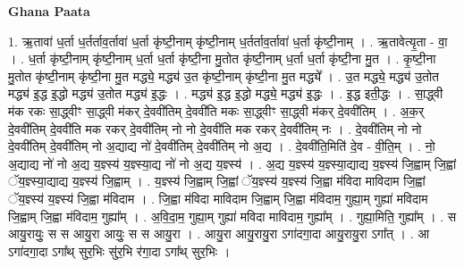 \documentclass[17pt]{extarticle}
\begin{document}
\textbf{Ghana Paata } \newline

1. ऋ॒तावा॑ ध॒र्ता ध॒र्तर्ताव॒र्तावा॑ ध॒र्ता कृ॑ष्टी॒नाम् कृ॑ष्टी॒नाम् ध॒र्तर्ताव॒र्तावा॑ ध॒र्ता कृ॑ष्टी॒नाम् । . ऋ॒तावेत्यृ॒ता - वा॒ । . ध॒र्ता कृ॑ष्टी॒नाम् कृ॑ष्टी॒नाम् ध॒र्ता ध॒र्ता कृ॑ष्टी॒ना मु॒तोत कृ॑ष्टी॒नाम् ध॒र्ता ध॒र्ता कृ॑ष्टी॒ना मु॒त । . कृ॒ष्टी॒ना मु॒तोत कृ॑ष्टी॒नाम् कृ॑ष्टी॒ना मु॒त मद्ध्ये॒ मद्ध्य॑ उ॒त कृ॑ष्टी॒नाम् कृ॑ष्टी॒ना मु॒त मद्ध्ये᳚ । . उ॒त मद्ध्ये॒ मद्ध्य॑ उ॒तोत मद्ध्य॑ इ॒द्ध इ॒द्धो मद्ध्य॑ उ॒तोत मद्ध्य॑ इ॒द्धः । . मद्ध्य॑ इ॒द्ध इ॒द्धो मद्ध्ये॒ मद्ध्य॑ इ॒द्धः । . इ॒द्ध इती॒द्धः । . सा॒द्ध्वी म॑क रकः सा॒द्ध्वीꣳ सा॒द्ध्वी म॑कर् दे॒ववी॑तिम् दे॒ववी॑ति मकः सा॒द्ध्वीꣳ सा॒द्ध्वी म॑कर् दे॒ववी॑तिम् । . अ॒क॒र् दे॒ववी॑तिम् दे॒ववी॑ति मक रकर् दे॒ववी॑तिम् नो नो दे॒ववी॑ति मक रकर् दे॒ववी॑तिम् नः । . दे॒ववी॑तिम् नो नो दे॒ववी॑तिम् दे॒ववी॑तिम् नो अ॒द्याद्य नो॑ दे॒ववी॑तिम् दे॒ववी॑तिम् नो अ॒द्य । . दे॒ववी॑ति॒मिति॑ दे॒व - वी॒ति॒म् । . नो॒ अ॒द्याद्य नो॑ नो अ॒द्य य॒ज्ञ्स्य॑ य॒ज्ञ्स्या॒द्य नो॑ नो अ॒द्य य॒ज्ञ्स्य॑ । . अ॒द्य य॒ज्ञ्स्य॑ य॒ज्ञ्स्या॒द्याद्य य॒ज्ञ्स्य॑ जि॒ह्वाम् जि॒ह्वां ॅय॒ज्ञ्स्या॒द्याद्य य॒ज्ञ्स्य॑ जि॒ह्वाम् । . य॒ज्ञ्स्य॑ जि॒ह्वाम् जि॒ह्वां ॅय॒ज्ञ्स्य॑ य॒ज्ञ्स्य॑ जि॒ह्वा म॑विदा माविदाम जि॒ह्वां ॅय॒ज्ञ्स्य॑ य॒ज्ञ्स्य॑ जि॒ह्वा म॑विदाम । . जि॒ह्वा म॑विदा माविदाम जि॒ह्वाम् जि॒ह्वा म॑विदाम॒ गुह्या॒म् गुह्या॑ मविदाम जि॒ह्वाम् जि॒ह्वा म॑विदाम॒ गुह्या᳚म् । . अ॒वि॒दा॒म॒ गुह्या॒म् गुह्या॑ मविदा माविदाम॒ गुह्या᳚म् । . गुह्या॒मिति॒ गुह्या᳚म् । . स आयु॒रायुः॒ स स आयु॒रा आयुः॒ स स आयु॒रा । . आयु॒रा आयु॒रायु॒रा ऽगा॑दगा॒दा आयु॒रायु॒रा ऽगा᳚त् । . आ ऽगा॑दगा॒दा ऽगा᳚थ् सुर॒भिः सु॑र॒भि र॑गा॒दा ऽगा᳚थ् सुर॒भिः । \newline
\end{document}
